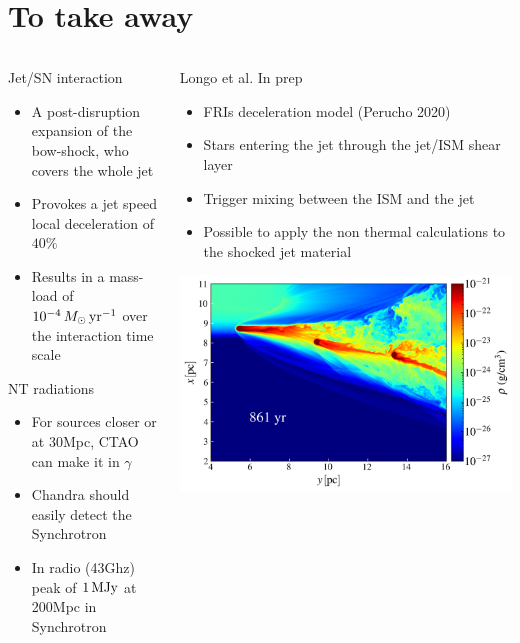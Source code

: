 \section{To take away}
\begin{frame}
	\begin{columns}
		{\scriptsize
		\begin{column}{0.5\textwidth}
				\begin{alertblock}{Jet/SN interaction}
				\begin{itemize}
					\item A post-disruption expansion of the bow-shock, who covers the whole jet
					\item Provokes a jet speed local deceleration of $40\%$
					\item Results in a mass-load of $10^{-4}\,M_{\odot}\,{\rm yr}^{-1}$
					      over the interaction time scale 
				\end{itemize}
			\end{alertblock}
				\begin{exampleblock}{NT radiations}
					\begin{itemize}
						\item For sources closer or at 30Mpc, CTAO can make it in $\gamma$ 
						\item Chandra should easily detect the Synchrotron
						\item In radio (43Ghz) peak of $1\,{\rm MJy}$ at 200Mpc in Synchrotron
					\end{itemize}
				\end{exampleblock}
		\end{column}
			\hspace{-.5cm}
		\begin{column}{0.5\textwidth}
			\begin{block}{Longo et al. In prep}
				\begin{itemize}
					\item FRIs deceleration model (Perucho 2020)
					\item Stars entering the jet through the jet/ISM shear layer
					\item Trigger mixing between the ISM and the jet 
					\item Possible to apply the non thermal calculations to the shocked jet material
				\end{itemize}
			\end{block}
			\centering
			\includegraphics[width=\textwidth]{images/jbs3_130.png}

\end{column}}
\end{columns}
\end{frame}
